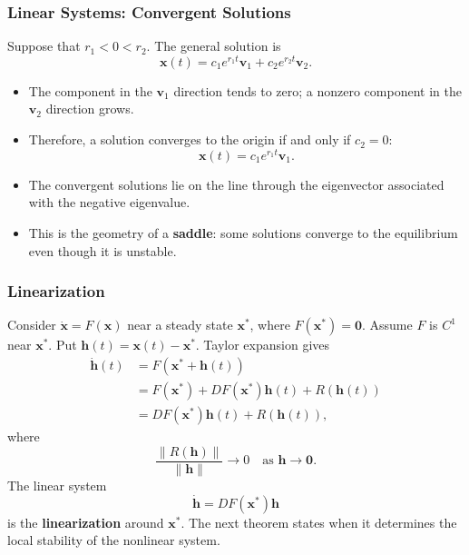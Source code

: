 \documentclass[9pt,aspectratio=169]{beamer}
\begin{document}
\begin{frame}
    \frametitle{Linear Systems: Convergent Solutions}
    Suppose that $r_1<0<r_2$. The general solution is
    \[
        \mathbf{x}(t)=c_1e^{r_1t}\mathbf{v}_1
                     +c_2e^{r_2t}\mathbf{v}_2.
    \]
    \begin{itemize}
        \item The component in the $\mathbf{v}_1$ direction tends to
        zero; a nonzero component in the $\mathbf{v}_2$ direction grows.
        \item Therefore, a solution converges to the origin if and only
        if $c_2=0$:
        \[
            \mathbf{x}(t)=c_1e^{r_1t}\mathbf{v}_1.
        \]
        \item The convergent solutions lie on the line through the
        eigenvector associated with the negative eigenvalue.
        \item This is the geometry of a \textbf{saddle}: some solutions
        converge to the equilibrium even though it is unstable.
    \end{itemize}
\end{frame}

\begin{frame}
    \frametitle{Linearization}
    Consider $\dot{\mathbf{x}}=F(\mathbf{x})$ near a steady state
    $\mathbf{x}^*$, where $F(\mathbf{x}^*)=\mathbf{0}$.
    Assume $F$ is $C^1$ near $\mathbf{x}^*$.
    Put $\mathbf{h}(t)=\mathbf{x}(t)-\mathbf{x}^*$. Taylor expansion gives
    \begin{align*}
        \dot{\mathbf{h}}(t)
        &=F(\mathbf{x}^*+\mathbf{h}(t))\\
        &=F(\mathbf{x}^*)+DF(\mathbf{x}^*)\mathbf{h}(t)+R(\mathbf{h}(t))\\
        &=DF(\mathbf{x}^*)\mathbf{h}(t)+R(\mathbf{h}(t)),
    \end{align*}
    where
    \[
        \frac{\|R(\mathbf{h})\|}{\|\mathbf{h}\|}\longrightarrow0
        \quad\text{as }\mathbf{h}\longrightarrow\mathbf{0}.
    \]
    The linear system
    \[
        \dot{\mathbf{h}}=DF(\mathbf{x}^*)\mathbf{h}
    \]
    is the \textbf{linearization} around $\mathbf{x}^*$. The next theorem
    states when it determines the local stability of the nonlinear system.
\end{frame}
\end{document}
